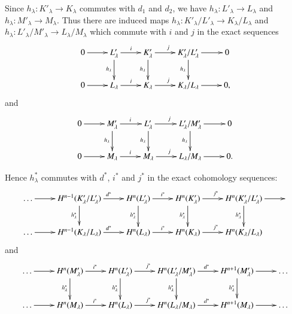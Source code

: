  Since $h_{\lambda} : K'_{\lambda} \rightarrow K_{\lambda}$ commutes
 with $d_1$ and $d_2$, we have $h_{\lambda} : L'_{\lambda} \rightarrow
 L_{\lambda}$ and $h_{\lambda} : M'_{\lambda} \rightarrow
 M_{\lambda}$. Thus there are induced maps $h_{\lambda} : K'_{\lambda}
 / L'_{\lambda} \rightarrow K_{\lambda}/L_{\lambda}$ and $h_{\lambda} :
 L'_{\lambda}/M'_{\lambda} \rightarrow L_{\lambda}/M_{\lambda}$ which
 commute with $i$ and $j$ in the exact sequences 
\[
\xymatrix{
0\ar[r] & L'_{\lambda} \ar[r]^i\ar[d]_{h_{\lambda}} & K'_{\lambda}
\ar[r]^j\ar[d]_{h_{\lambda}} & K'_{\lambda} / L'_{\lambda} \ar[r]
\ar[d]_{h_{\lambda}} & 0\\
0 \ar[r] & L_{\lambda} \ar[r]^i & K_{\lambda} \ar[r]^j &
K_{\lambda}/L_{\lambda} \ar[r] & 0,
}
\]
and
\[
\xymatrix{
0\ar[r] & M'_{\lambda} \ar[r]^i\ar[d]_{h_{\lambda}} & L'_{\lambda}
\ar[r]^j\ar[d]_{h_{\lambda}} & L'_{\lambda} / M'_{\lambda} \ar[r]
\ar[d]_{h_{\lambda}} & 0\\
0 \ar[r] & M_{\lambda} \ar[r]^i & M_{\lambda} \ar[r]^j &
L_{\lambda}/M_{\lambda} \ar[r] & 0.
}
\]

 Hence $h^\ast_{\lambda}$ commutes with $d^\ast$, $i^*$ and $j^*$ in the
 exact cohomology sequences: 
{\fontsize{9}{11}\selectfont
\[
\xymatrix{
\ldots \ar[r] & H^{n-1} (K'_{\lambda}/L'_{\lambda})
\ar[r]^{d^{\ast}}\ar[d]_{h^{\ast}_{\lambda}} &
H^n(L'_{\lambda})\ar[r]^{i^{\ast}}\ar[d]_{h^{\ast}_{\lambda}} &
H^{n}(K'_{\lambda}) \ar[r]^{j^{\ast}}\ar[d]_{h^{\ast}_\lambda} &
H^n(K'_{\lambda}/L'_{\lambda}) \ar[r] \ar[d]_{h^{\ast}_\lambda} &  \\
\ldots \ar[r] & H^{n-1}(K_{\lambda}/L_{\lambda}) \ar[r]^{d^{\ast}} &
H^n(L_{\lambda}) \ar[r]^{i^{\ast}} & H^n(K_{\lambda})
\ar[r]^{j^{\ast}} & H^n (K_{\lambda}/L_{\lambda})& 
}
\]
and
\[
\xymatrix{
\ldots \ar[r] & H^{n} (M'_{\lambda})
\ar[r]^{i^{\ast}}\ar[d]_{h^{\ast}_{\lambda}} &
H^n(L'_{\lambda})\ar[r]^{j^{\ast}}\ar[d]_{h^{\ast}_{\lambda}} &
H^{n}(L'_{\lambda}/M'_{\lambda}) \ar[r]^{d^{\ast}}\ar[d]_{h^{\ast}_\lambda} &
H^{n+1}(M'_{\lambda}) \ar[r] \ar[d]_{h^{\ast}_\lambda} & \ldots \\
\ldots \ar[r] & H^n(M_{\lambda}) \ar[r]^{i^{\ast}} &
H^n(L_{\lambda}) \ar[r]^{j^{\ast}} & H^n(L_{\lambda}/M_{\lambda})
\ar[r]^{d^{\ast}} & H^{n+1} (M_{\lambda}) \ar[r]& \ldots 
}
\]}\relax

